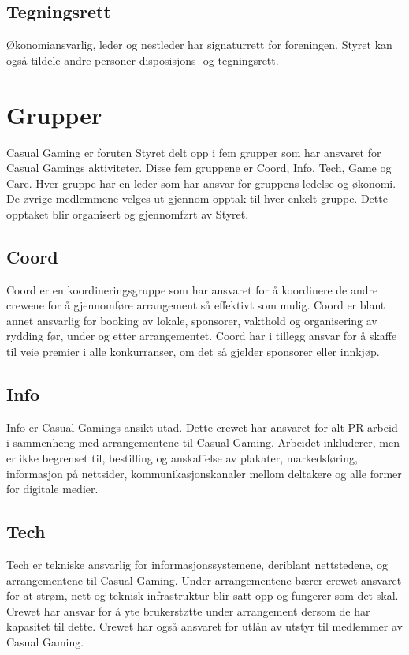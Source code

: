 \subsection{Tegningsrett}
Økonomiansvarlig, leder og nestleder har signaturrett for foreningen. Styret kan også tildele andre personer disposisjons- og tegningsrett.

\section{Grupper}
Casual Gaming er foruten Styret delt opp i fem grupper som har ansvaret for Casual Gamings aktiviteter. Disse fem gruppene er Coord, Info, Tech, Game og Care. Hver gruppe har en leder som har ansvar for gruppens ledelse og økonomi. De øvrige medlemmene velges ut gjennom opptak til hver enkelt gruppe. Dette opptaket blir organisert og gjennomført av Styret.

\subsection{Coord}
Coord er en koordineringsgruppe som har ansvaret for å koordinere de andre crewene for å gjennomføre arrangement så effektivt som mulig. Coord er blant annet ansvarlig for booking av lokale, sponsorer, vakthold og organisering av rydding før, under og etter arrangementet. Coord har i tillegg ansvar for å skaffe til veie premier i alle konkurranser, om det så gjelder sponsorer eller innkjøp.

\subsection{Info}
Info er Casual Gamings ansikt utad. Dette crewet har ansvaret for alt PR­‐arbeid i sammenheng med arrangementene til Casual Gaming. Arbeidet inkluderer, men er ikke begrenset til, bestilling og anskaffelse av plakater, markedsføring, informasjon på nettsider, kommunikasjonskanaler mellom deltakere og alle former for digitale medier.

\subsection{Tech}
Tech er tekniske ansvarlig for informasjonssystemene, deriblant nettstedene, og arrangementene til Casual Gaming. Under arrangementene bærer crewet ansvaret for at strøm, nett og teknisk infrastruktur blir satt opp og fungerer som det skal. Crewet har ansvar for å yte brukerstøtte under arrangement dersom de har kapasitet til dette. Crewet har også ansvaret for utlån av utstyr til medlemmer av Casual Gaming.

